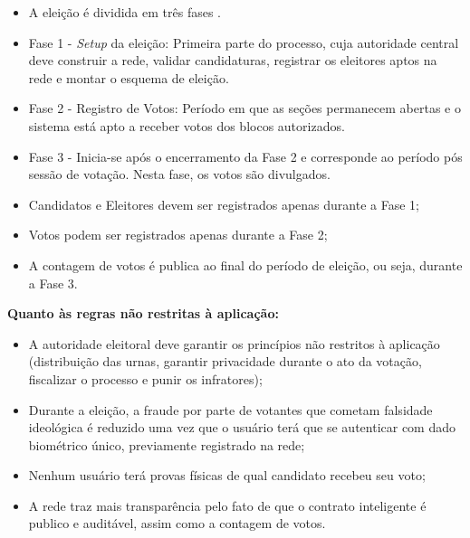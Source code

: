 \documentclass[portuguese]{textolivre}
\begin{document}
	\begin{itemize}
		\item A eleição é dividida em três fases \cite{Soares_Vasconcelos_2023}.
		\item Fase 1 - \emph{Setup} da eleição: Primeira parte do processo, cuja autoridade central deve construir a rede, validar candidaturas, registrar os eleitores aptos na rede e montar o esquema de eleição.
		\item Fase 2 - Registro de Votos: Período em que as seções permanecem abertas e o sistema está apto a receber votos dos blocos autorizados. 
		\item Fase 3 - Inicia-se após o encerramento da Fase 2 e corresponde ao período pós sessão de votação. Nesta fase,  os votos são divulgados.
		\item Candidatos e Eleitores devem ser registrados apenas durante a Fase 1;
		\item Votos podem ser registrados apenas durante a Fase 2;
		\item A contagem de votos é publica ao final do período de eleição, ou seja, durante a Fase 3.
	\end{itemize}
	\textbf{Quanto às regras não restritas à aplicação: }
	\begin{itemize}
		\item A autoridade eleitoral deve garantir os princípios não restritos à aplicação (distribuição das urnas, garantir privacidade durante o ato da votação, fiscalizar o processo e punir os infratores);
		\item Durante a eleição, a fraude por parte de votantes que cometam falsidade ideológica é reduzido uma vez que o usuário terá que se autenticar com dado biométrico único, previamente registrado na rede;
		\item Nenhum usuário terá provas físicas de qual candidato recebeu seu voto;
		\item A rede traz mais transparência pelo fato de que o contrato inteligente é publico e auditável, assim como a contagem de votos. 
	\end{itemize}
	
\end{document}
